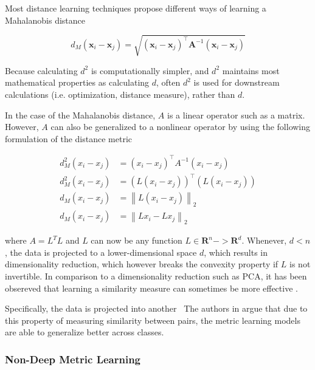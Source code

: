 \documentclass[a4paper,12pt,oneside,openright]{report}
\begin{document}
Most distance learning techniques propose different ways of learning a Mahalanobis distance \cite{mahalanobis36}

\begin{equation}
d_{M}\left(\boldsymbol{x}_{i}-\boldsymbol{x}_{j}\right)=\sqrt{\left(\boldsymbol{x}_{i}-\boldsymbol{x}_{j}\right)^{\top} \boldsymbol{A}^{-1}\left(\boldsymbol{x}_{i}-\boldsymbol{x}_{j}\right)}
\end{equation}

Because calculating $d^2$ is computationally simpler, and $d^2$ maintains most mathematical properties as calculating $d$, often $d^2$ is used for downstream calculations (i.e. optimization, distance measure), rather than $d$.

In the case of the Mahalanobis distance, $A$ is a linear operator such as a matrix.
However, $A$ can also be generalized to a nonlinear operator by using the following formulation of the distance metric

\begin{align}
d_{M}^{2}\left(x_{i}-x_{j}\right) &=\left(x_{i}-x_{j}\right)^{\top} A^{-1}\left(x_{i}-x_{j}\right) \\
d_{M}^{2}\left(x_{i}-x_{j}\right) &= (L\left(x_{i}-x_{j}\right))^{\top} (L\left(x_{i}-x_{j}\right)) \\
d_{M}\left(x_{i}-x_{j}\right) &=\left\|L\left(x_{i}-x_{j}\right)\right\|_{2} \\
d_{M}\left(x_{i}-x_{j}\right) &=\left\|Lx_{i}-Lx_{j}\right\|_{2}
\end{align}

where $A = L^T L$ and $L$ can now be any function $L \in \mathbf{R}^n -> \mathbf{R}^d$. 
Whenever, $d < n$, the data is projected to a lower-dimensional space $d$, which results in dimensionality reduction, which however breaks the convexity property if $L$ is not invertible.
In comparison to a dimensionality reduction such as PCA, it has been obsereved that learning a similarity measure can sometimes be more effective \cite{chechik10}.

Specifically, the data is projected into another  \
The authors in \cite{moutafis17} argue that due to this property of measuring similarity between pairs, the metric learning models are able to generalize better across classes.

\subsubsection{Non-Deep Metric Learning}
\end{document}
